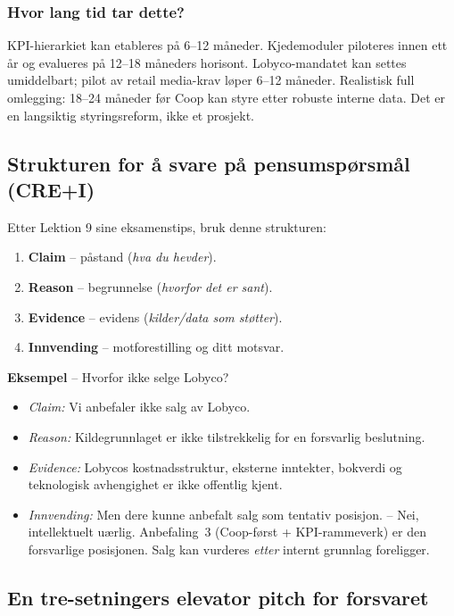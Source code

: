 \subsubsection*{\guillemotleft{}Hvor lang tid tar dette?\guillemotright{}}
KPI-hierarkiet kan etableres på 6--12 måneder. Kjedemoduler piloteres innen
ett år og evalueres på 12--18 måneders horisont. Lobyco-mandatet kan settes
umiddelbart; pilot av retail media-krav løper 6--12 måneder. Realistisk
full omlegging: 18--24 måneder før Coop kan styre etter robuste interne
data. Det er en langsiktig styringsreform, ikke et prosjekt.

\subsection{Strukturen for å svare på pensumspørsmål (CRE+I)}

Etter Lektion 9 sine eksamenstips, bruk denne strukturen:
\begin{enumerate}
  \item \textbf{Claim} -- påstand (\textit{hva du hevder}).
  \item \textbf{Reason} -- begrunnelse (\textit{hvorfor det er sant}).
  \item \textbf{Evidence} -- evidens (\textit{kilder/data som støtter}).
  \item \textbf{Innvending} -- motforestilling og ditt motsvar.
\end{enumerate}

\textbf{Eksempel} -- \guillemotleft{}Hvorfor ikke selge Lobyco?\guillemotright{}
\begin{itemize}
  \item \emph{Claim:} Vi anbefaler ikke salg av Lobyco.
  \item \emph{Reason:} Kildegrunnlaget er ikke tilstrekkelig for en
    forsvarlig beslutning.
  \item \emph{Evidence:} Lobycos kostnadsstruktur, eksterne inntekter,
    bokverdi og teknologisk avhengighet er ikke offentlig kjent.
  \item \emph{Innvending:} \guillemotleft{}Men dere kunne anbefalt salg som
    tentativ posisjon.\guillemotright{} -- Nei, intellektuelt uærlig.
    Anbefaling~3 (Coop-først + KPI-rammeverk) er den forsvarlige
    posisjonen. Salg kan vurderes \emph{etter} internt grunnlag foreligger.
\end{itemize}

\subsection{En tre-setningers \guillemotleft{}elevator pitch\guillemotright{} for forsvaret}

